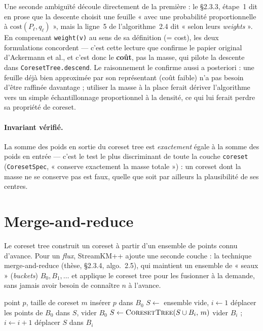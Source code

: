 Une seconde ambiguïté découle directement de la première : le §2.3.3, étape~1
dit en prose que la descente choisit une feuille « avec une probabilité
proportionnelle à $\mathrm{cost}(P_\ell, q_\ell)$ », mais la ligne~5 de
l'algorithme~2.4 dit « selon leurs \emph{weights} ». En comprenant
\texttt{weight(v)} au sens de sa définition (= cost), les deux formulations
concordent --- c'est cette lecture que confirme le papier original d'Ackermann
et al., et c'est donc le \textbf{coût}, pas la masse, qui pilote la descente
dans \texttt{CoresetTree.descend}. Le raisonnement le confirme aussi a
posteriori : une feuille déjà bien approximée par son représentant (coût
faible) n'a pas besoin d'être raffinée davantage ; utiliser la masse à la
place ferait dériver l'algorithme vers un simple échantillonnage
proportionnel à la densité, ce qui lui ferait perdre sa propriété de coreset.

\paragraph{Invariant vérifié.} La somme des poids en sortie du coreset tree
est \emph{exactement} égale à la somme des poids en entrée --- c'est le test
le plus discriminant de toute la couche \texttt{coreset}
(\texttt{CoresetSpec}, « conserve exactement la masse totale ») : un coreset
dont la masse ne se conserve pas est faux, quelle que soit par ailleurs
la plausibilité de ses centres.

\section{Merge-and-reduce}
\label{sec:algo-merge-reduce}

Le coreset tree construit un coreset à partir d'un ensemble de points connu
d'avance. Pour un \emph{flux}, StreamKM++ ajoute une seconde couche : la
technique merge-and-reduce (thèse, §2.3.4, algo.~2.5), qui maintient un
ensemble de « seaux » (\emph{buckets}) $B_0, B_1, \dots$ et applique le
coreset tree pour les fusionner à la demande, sans jamais avoir besoin de
connaître $n$ à l'avance.

\begin{algorithm}[H]
\caption{Insertion dans le flux (thèse, algo. 2.5 --- \texttt{BucketManager.insert})}
\begin{algorithmic}[1]
\Require point $p$, taille de coreset $m$
\State insérer $p$ dans $B_0$
  \State $S \gets$ ensemble vide, $i \gets 1$
  \State déplacer les points de $B_0$ dans $S$, vider $B_0$
    \State $S \gets \textsc{CoresetTree}(S \cup B_i,\, m)$ 
    \State vider $B_i$ ;\; $i \gets i+1$
  \EndWhile
  \State déplacer $S$ dans $B_i$
\EndIf
\end{algorithmic}
\end{algorithm}

